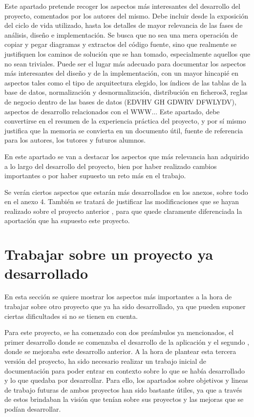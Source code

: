 
Este apartado pretende recoger los aspectos más interesantes del desarrollo del proyecto, comentados por los autores del mismo.
Debe incluir desde la exposición del ciclo de vida utilizado, hasta los detalles de mayor relevancia de las fases de análisis, diseño e implementación.
Se busca que no sea una mera operación de copiar y pegar diagramas y extractos del código fuente, sino que realmente se justifiquen los caminos de solución que se han tomado, especialmente aquellos que no sean triviales.
Puede ser el lugar más adecuado para documentar los aspectos más interesantes del diseño y de la implementación, con un mayor hincapié en aspectos tales como el tipo de arquitectura elegido, los índices de las tablas de la base de datos, normalización y desnormalización, distribución en ficheros3, reglas de negocio dentro de las bases de datos (EDVHV GH GDWRV DFWLYDV), aspectos de desarrollo relacionados con el WWW...
Este apartado, debe convertirse en el resumen de la experiencia práctica del proyecto, y por sí mismo justifica que la memoria se convierta en un documento útil, fuente de referencia para los autores, los tutores y futuros alumnos.

En este apartado se van a destacar los aspectos que más relevancia han adquirido a lo largo del desarrollo del proyecto, bien por haber realizado cambios importantes o por haber supuesto un reto más en el trabajo.

Se verán ciertos aspectos que estarán más desarrollados en los anexos, sobre todo en el anexo 4. También se tratará de justificar las modificaciones que se hayan realizado sobre el proyecto anterior \cite{tfm1}, para que quede claramente diferenciada la aportación que ha supuesto este proyecto.

\section{Trabajar sobre un proyecto ya desarrollado}

En esta sección se quiere mostrar los aspectos más importantes a la hora de trabajar sobre otro proyecto que ya ha sido desarrollado, ya que pueden suponer ciertas dificultades si no se tienen en cuenta.

Para este proyecto, se ha comenzado con dos preámbulos ya mencionados, el primer desarrollo \cite{tfg1} donde se comenzaba el desarrollo de la aplicación y el segundo \cite{tfm1}, donde se mejoraba este desarrollo anterior. A la hora de plantear esta tercera versión del proyecto, ha sido necesario realizar un trabajo inicial de documentación para poder entrar en contexto sobre lo que se había desarrollado y lo que quedaba por desarrollar. Para ello, los apartados sobre objetivos y lineas de trabajo futuras de ambos proyectos han sido bastante útiles, ya que a través de estos brindaban la visión que tenían sobre sus proyectos y las mejoras que se podían desarrollar.

